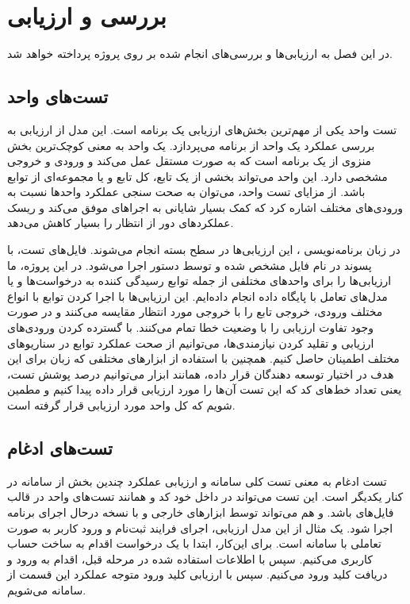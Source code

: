 \chapter{بررسی و ارزیابی}
در این فصل به ارزیابی‌ها و بررسی‌های انجام شده بر روی پروژه پرداخته خواهد شد.

\section{تست‌های واحد}
تست واحد یکی از مهم‌ترین بخش‌های ارزیابی یک برنامه است. این مدل از ارزیابی به بررسی عملکرد یک واحد از برنامه می‌پردازد. یک واحد به معنی کوچک‌ترین بخش منزوی از یک برنامه ‌است که به صورت مستقل عمل می‌کند و ورودی و خروجی مشخصی دارد. این واحد می‌تواند بخشی از یک تابع، کل تابع و یا مجموعه‌ای از توابع باشد. از مزایای تست واحد، می‌توان به صحت سنجی عملکرد واحد‌ها نسبت به ورودی‌های مختلف اشاره کرد که کمک بسیار شایانی به اجرا‌های موفق می‌کند و ریسک عملکردهای دور از انتظار را بسیار کاهش می‌دهد. 

در زبان برنامه‌نویسی ، این ارزیابی‌ها در سطح بسته انجام می‌شوند. فایل‌های تست، با پسوند  در نام فایل مشخص شده و توسط دستور  اجرا می‌شود. در این پروژه، ما ارزیابی‌ها را برای واحدهای مختلفی از جمله توابع رسیدگی کننده به درخواست‌ها و یا مدل‌های تعامل با پایگاه داده انجام داده‌ایم. این ارزیابی‌ها با اجرا کردن توابع با انواع مختلف ورودی، خروجی تابع را با خروجی مورد انتظار مقایسه می‌کنند و در صورت وجود تفاوت ارزیابی را با وضعیت خطا تمام می‌کنند. با گسترده کردن ورودی‌های ارزیابی و تقلید کردن نیازمندی‌ها، می‌توانیم از صحت عملکرد توابع در سناریو‌های مختلف اطمینان حاصل کنیم. همچنین با استفاده از ابزار‌های مختلفی که زبان  برای این هدف در اختیار توسعه دهندگان قرار داده، همانند ابزار  می‌توانیم درصد پوشش تست، یعنی تعداد خط‌های کد که این تست آن‌ها را مورد ارزیابی قرار داده پیدا کنیم و مطمین شویم که کل واحد مورد ارزیابی قرار گرفته است.


\section{تست‌های ادغام}
تست ادغام به معنی تست کلی سامانه و ارزیابی عملکرد چندین بخش از سامانه در کنار یکدیگر است. این تست می‌تواند در داخل خود کد و همانند تست‌های واحد در قالب فایل‌های  باشد. و هم می‌تواند توسط ابزار‌های خارجی و با نسخه درحال اجرای برنامه اجرا شود. یک مثال از این مدل ارزیابی، اجرای فرایند ثبت‌نام و ورود کاربر به صورت تعاملی با سامانه است. برای این‌کار، ابتدا با یک درخواست اقدام به ساخت حساب کاربری می‌کنیم. سپس با اطلاعات استفاده شده در مرحله قبل، اقدام به ورود و دریافت کلید ورود می‌کنیم. سپس با ارزیابی کلید ورود متوجه عملکرد این قسمت از سامانه می‌شویم.


